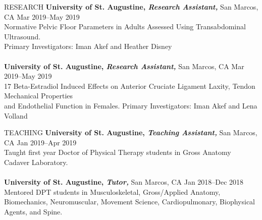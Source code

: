 \documentclass{resume} %
\begin{document}
\begin{rSection}{RESEARCH}
{\textbf{University of St. Augustine, \textit{Research Assistant,}} San Marcos, CA \hfill Mar 2019--May 2019 \\
Normative Pelvic Floor Parameters in Adults Assessed Using Transabdominal Ultrasound. \\Primary Investigators: Iman Akef and Heather Disney}
\\\\
{\textbf{University of St. Augustine, \textit{Research Assistant,}} San Marcos, CA \hfill Mar 2019--May 2019 \\
17 Beta-Estradiol Induced Effects on Anterior Cruciate Ligament Laxity, Tendon Mechanical Properties \\and Endothelial Function in Females. Primary Investigators: Iman Akef and Lena Volland}
\end{rSection} 
\begin{rSection}{TEACHING}
{\textbf{University of St. Augustine, \textit{Teaching Assistant,}} San Marcos, CA \hfill Jan 2019--Apr 2019 \\
Taught first year Doctor of Physical Therapy students in Gross Anatomy Cadaver Laboratory.}
\\\\
{\textbf{University of St. Augustine, \textit{Tutor,}} San Marcos, CA \hfill Jan 2018--Dec 2018 \\
Mentored DPT students in Musculoskeletal, Gross/Applied Anatomy, \\Biomechanics, Neuromuscular, Movement Science, Cardiopulmonary, Biophysical Agents, and Spine.}
\end{rSection} 

\begin{rSection}{CONTINUING EDUCATION}
{\textbf{Understanding Dementia}} \hfill July 2019\\
University of Tasmania \& Wicking Dementia Research \& Education Centre }
\end{rSection}
\end{document}
